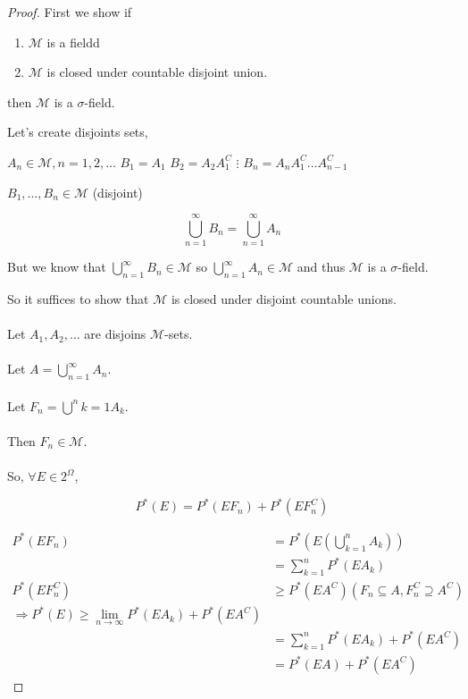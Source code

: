 \documentclass[11pt,fleqn]{book} %
\begin{document}
\begin{proof}
	First we show if\\

	\begin{enumerate}
		\item $\mathcal{M}$ is a fieldd
		\item $\mathcal{M}$ is closed under countable disjoint union.
	\end{enumerate}

then $\mathcal{M}$ is a $\sigma$-field.

Let's create disjoints sets, 

$A_n \in \mathcal{M}, n = 1, 2, \dots$
$B_1 = A_1$
$B_2 = A_2 A^C_1$
$\vdots$
$B_n = A_n A_1^C \dots A_{n-1}^C$

$B_1, \dots, B_n \in \mathcal{M}$ (disjoint)


$$\bigcup^\infty_{n=1} B_n = \bigcup^\infty_{n=1} A_n $$

But we know that $\bigcup^\infty_{n=1} B_n \in \mathcal{M}$ so $\bigcup^\infty_{n=1} A_n \in \mathcal{M}$ and thus $\mathcal{M}$ is a $\sigma$-field.

So it suffices to show that $\mathcal{M}$ is closed under disjoint countable unions.\\
\\
Let $A_1, A_2, \dots$ are disjoins $\mathcal{M}$-sets.\\ 
\\
Let $A = \bigcup^\infty_{n=1} A_n$.\\ 
\\
Let $F_n = \bigcup^n{k=1} A_k$.\\ 
\\
Then $F_n \in \mathcal{M}$.\\
\\
So, $\forall E \in 2^\Omega$, 

$$P^*(E) = P^*(E F_n) + P^*(E F_n^C) $$

\begin{align*}
	P^*(E F_n) &= P^*(E(\bigcup_{k=1}^n A_k))\\
		&= \displaystyle \sum^n_{k=1} P^*(E A_k)\\
P^*(E F_n^C) &\geq P^*(E A^C)  (F_n \subseteq A, F_n^C \supseteq A^C)\\
	\Rightarrow P^*(E) \geq \lim_{n \rightarrow \infty} P^*(E A_k) + P^*(E A^C)\\
		&= \displaystyle \sum^n_{k=1} P^*(E A_k) + P^*(E A^C)\\
		&= P^*(EA) + P^*(E A^C)
\end{align*}
 

\end{proof}
\end{document}
